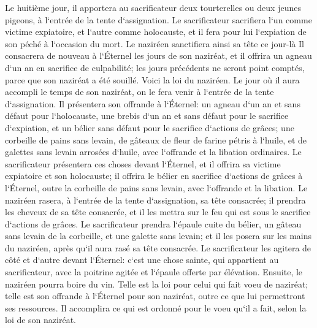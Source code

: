 \verse Le huitième jour, il apportera au sacrificateur deux tourterelles ou deux jeunes pigeons, à l`entrée de la tente d`assignation. 
\verse Le sacrificateur sacrifiera l`un comme victime expiatoire, et l`autre comme holocauste, et il fera pour lui l`expiation de son péché à l`occasion du mort. Le naziréen sanctifiera ainsi sa tête ce jour-là 
\verse Il consacrera de nouveau à l`Éternel les jours de son naziréat, et il offrira un agneau d`un an en sacrifice de culpabilité; les jours précédents ne seront point comptés, parce que son naziréat a été souillé. 
\verse Voici la loi du naziréen. Le jour où il aura accompli le temps de son naziréat, on le fera venir à l`entrée de la tente d`assignation. 
\verse Il présentera son offrande à l`Éternel: un agneau d`un an et sans défaut pour l`holocauste, une brebis d`un an et sans défaut pour le sacrifice d`expiation, et un bélier sans défaut pour le sacrifice d`actions de grâces; 
\verse une corbeille de pains sans levain, de gâteaux de fleur de farine pétris à l`huile, et de galettes sans levain arrosées d`huile, avec l`offrande et la libation ordinaires. 
\verse Le sacrificateur présentera ces choses devant l`Éternel, et il offrira sa victime expiatoire et son holocauste; 
\verse il offrira le bélier en sacrifice d`actions de grâces à l`Éternel, outre la corbeille de pains sans levain, avec l`offrande et la libation. 
\verse Le naziréen rasera, à l`entrée de la tente d`assignation, sa tête consacrée; il prendra les cheveux de sa tête consacrée, et il les mettra sur le feu qui est sous le sacrifice d`actions de grâces. 
\verse Le sacrificateur prendra l`épaule cuite du bélier, un gâteau sans levain de la corbeille, et une galette sans levain; et il les posera sur les mains du naziréen, après qu`il aura rasé sa tête consacrée. 
\verse Le sacrificateur les agitera de côté et d`autre devant l`Éternel: c`est une chose sainte, qui appartient au sacrificateur, avec la poitrine agitée et l`épaule offerte par élévation. Ensuite, le naziréen pourra boire du vin. 
\verse Telle est la loi pour celui qui fait voeu de naziréat; telle est son offrande à l`Éternel pour son naziréat, outre ce que lui permettront ses ressources. Il accomplira ce qui est ordonné pour le voeu qu`il a fait, selon la loi de son naziréat. 
